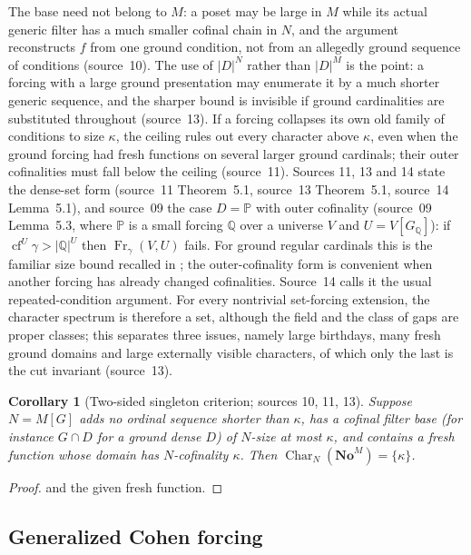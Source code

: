 \documentclass[11pt,letterpaper]{article}
\numberwithin{equation}{section}
\newtheorem{corollary}[corollary]{Corollary}
\theoremstyle{definition}
\theoremstyle{remark}
\newcommand{\No}{\mathbf{No}}
\newcommand{\NoM}{\No^{M}}
\newcommand{\cf}{\operatorname{cf}}
\newcommand{\abs}[1]{\lvert#1\rvert}
\newcommand{\Char}{\operatorname{Char}}
\newcommand{\Fr}{\operatorname{Fr}}
\begin{document}
The base need not belong to $M$: a poset may be large in $M$ while its actual
generic filter has a much smaller cofinal chain in $N$, and the argument
reconstructs $f$ from one ground condition, not from an allegedly ground sequence
of conditions (source~10). The use of $\abs D^N$ rather than $\abs D^M$ is the
point: a forcing with a large ground presentation may enumerate it by a much
shorter generic sequence, and the sharper bound is invisible if ground
cardinalities are substituted throughout (source~13). If a forcing collapses its
own old family of conditions to size $\kappa$, the ceiling rules out every
character above $\kappa$, even when the ground forcing had fresh functions on
several larger ground cardinals; their outer cofinalities must fall below the
ceiling (source~11). Sources 11, 13 and 14 state the dense-set form (source~11
Theorem~5.1, source~13 Theorem~5.1, source~14 Lemma~5.1), and source~09 the case
$D=\mathbb P$ with outer cofinality (source~09 Lemma~5.3, where $\mathbb P$ is a
small forcing $\mathbb Q$ over a universe $V$ and $U=V[G_{\mathbb Q}]$): if
$\cf^U\gamma>\abs{\mathbb Q}^U$ then $\Fr_\gamma(V,U)$ fails. For ground regular
cardinals this is the familiar size bound recalled in \cite[Corollary~2.3]{FKW};
the outer-cofinality form is convenient when another forcing has already changed
cofinalities. Source~14 calls it the usual repeated-condition argument. For every
nontrivial set-forcing extension, the character spectrum is therefore a set,
although the field and the class of gaps are proper classes; this separates three
issues, namely large birthdays, many fresh ground domains and large externally
visible characters, of which only the last is the cut invariant (source~13).

\begin{corollary}[Two-sided singleton criterion; sources 10, 11, 13]\label{univ:gs:cor:singleton}
Suppose $N=M[G]$ adds no ordinal sequence shorter than $\kappa$, has a cofinal
filter base (for instance $G\cap D$ for a ground dense $D$) of $N$-size at most
$\kappa$, and contains a fresh function whose domain has $N$-cofinality $\kappa$.
Then $\Char_N(\NoM)=\{\kappa\}$.
\end{corollary}
\begin{proof}
 and the given fresh function.
\end{proof}

\subsection{Generalized Cohen forcing}
\end{document}

